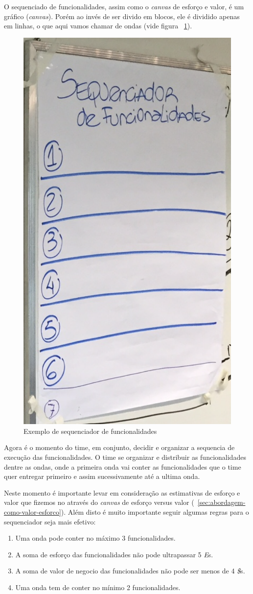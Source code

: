 \documentclass[10pt]{article}
\begin{document}
            O sequenciado de funcionalidades, assim como o \textit{canvas} de esforço e valor, é um gráfico (\textit{canvas}). Porém ao invés de ser divido em blocos, ele é dividido apenas em linhas, o que aqui vamos chamar de ondas (vide figura ~\ref{figura:7}).
            
            \begin{figure}[H]
        		\centering
        		\includegraphics[width=.4\textwidth]{images/sequenciador.png}
        		\caption{Exemplo de sequenciador de funcionalidades}
        		\label{figura:7}
        	\end{figure}
        	
        	Agora é o momento do time, em conjunto, decidir e organizar a sequencia de execução das funcionalidades. O time se organizar e distribuir as funcionalidades
        	dentre as ondas, onde a primeira onda vai conter as funcionalidades que o time quer entregar primeiro e assim sucessivamente até a ultima onda.
        	
        	
        	Neste momento é importante levar em consideração as estimativas de esforço e valor que fizemos no através do \textit{canvas} de esforço versus valor (~\ref{sec:abordagem-como-valor-esforco}). Além disto é muito importante seguir algumas regras para o sequenciador seja mais efetivo:
        	
        	\begin{enumerate}
                \item Uma onda pode conter no máximo 3 funcionalidades.
                
                \item A soma de esforço das funcionalidades não pode ultrapassar 5 \textit{E}s.
                
                \item A soma de valor de negocio das funcionalidades não pode ser menos de 4 \textit{\$}s.
                
                \item Uma onda tem de conter no mínimo 2 funcionalidades.
            \end{enumerate}
        	
\end{document}
